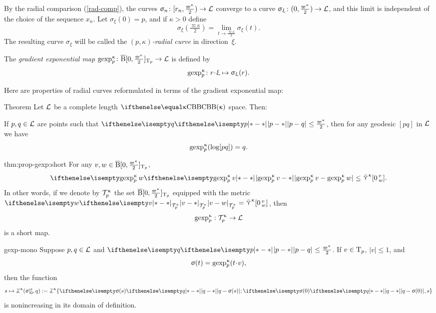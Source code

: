 By the radial comparison (\ref{rad-comp}), 
the curves $\sigma_n\:[r_n,\tfrac{\varpi\kappa}2)\to \spc{L}$ 
converge to a curve $\sigma_\xi\:(0,\tfrac{\varpi\kappa}2)\to \spc{L}$, 
and this limit is independent of the choice of the sequence $x_n$.
Let $\sigma_\xi(0)=p$, and if $\kappa>0$ define \[\sigma_\xi(\tfrac{\varpi\kappa}2)
=
\lim_{t\to\frac{\varpi\kappa}2}\sigma_\xi(t).\]
The resulting curve $\sigma_\xi$ will be called the \emph{$(p,\kappa)$-radial curve} in direction~$\xi$.

The \emph{gradient exponential map} 
$\gexp\mc\kappa_p\:\cBall[\0,\tfrac{\varpi\kappa}2]_{\T_p}\to \spc{L}$
is defined by
\[
\gexp\mc\kappa_p\: r\cdot\xi\mapsto\sigma_\xi(r).
\]



Here are properties of radial curves reformulated in terms of the gradient exponential map:

\begin{thm}{Theorem}\label{thm:prop-gexp}
Let $\mathcal{L}$ be a complete length $\Alex{\kappa}$ space. 
Then:
\begin{subthm}{}
If $p,q\in \spc{L}$ are points such that $\dist{p}{q}{}\le\tfrac{\varpi\kappa}2$, then for any geodesic $[pq]$ in $\mathcal{L}$ we have
\[\mathop{\rm gexp}\nolimits^{\upkappa}_p(\mathrm{log}[{p}{q}])=q.\] 
\end{subthm}

\begin{subthm}{thm:prop-gexp:short} 
For any $v,w\in \cBall[\0,\tfrac{\varpi\kappa}2]_{\T_p}$,
\[\dist{\gexp\mc\kappa_p v}{\gexp\mc\kappa_p w}{}
\le
\side\kappa\hinge{\0}v w.\]
In other words, if we denote by $\mathcal{T}_{p}^{\upkappa}$ the set $\cBall[\0,\tfrac{\varpi\kappa}2]_{\T_p}$ 
equipped with the metric $\dist{v}{w}{\mathcal{T}\mc\kappa_{p}}=\side\kappa\hinge{\0}v w$, 
then 
\[\gexp\mc\kappa_p:\mathcal{T}\mc\kappa_{p}\to \spc{L}\] 
is a short map.
\end{subthm}

\begin{subthm}{gexp-mono} 
Suppose
$p, q\in \spc{L}$ 
and $\dist{p}{q}{}\le \tfrac{\varpi\kappa}2$.
If $v\in\T_p$, $|v|\le 1$, and 
\[\sigma(t)=\gexp\mc\kappa_p(t\cdot v),\]
then the function
\[
s
\mapsto 
\tangle\mc\kappa(\sigma|_0^s,q)
\df
\tangle\mc\kappa\{\dist{q}{\sigma(s)}{};\dist{q}{\sigma(0)}{},s\}
\]
is nonincreasing in its domain of definition.
\end{subthm}
\end{thm}

